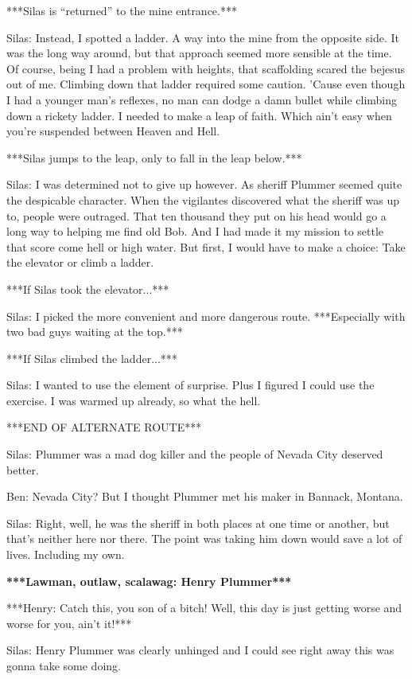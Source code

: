 \documentclass{article}
\begin{document}
***Silas is “returned” to the mine entrance.***

Silas: Instead, I spotted a ladder. A way into the mine from the opposite side. It was the long way around, but that approach seemed more sensible at the time. Of course, being I had a problem with heights, that scaffolding scared the bejesus out of me. Climbing down that ladder required some caution. 'Cause even though I had a younger man's reflexes, no man can dodge a damn bullet while climbing down a rickety ladder. I needed to make a leap of faith. Which ain't easy when you're suspended between Heaven and Hell.

***Silas jumps to the leap, only to fall in the leap below.***

Silas: I was determined not to give up however. As sheriff Plummer seemed quite the despicable character. When the vigilantes discovered what the sheriff was up to, people were outraged. That ten thousand they put on his head would go a long way to helping me find old Bob. And I had made it my mission to settle that score come hell or high water. But first, I would have to make a choice: Take the elevator or climb a ladder.

***If Silas took the elevator...***

Silas: I picked the more convenient and more dangerous route. ***Especially with two bad guys waiting at the top.***

***If Silas climbed the ladder...***

Silas: I wanted to use the element of surprise. Plus I figured I could use the exercise. I was warmed up already, so what the hell.

***END OF ALTERNATE ROUTE***

Silas: Plummer was a mad dog killer and the people of Nevada City deserved better.

Ben: Nevada City? But I thought Plummer met his maker in Bannack, Montana.

Silas: Right, well, he was the sheriff in both places at one time or another, but that's neither here nor there. The point was taking him down would save a lot of lives. Including my own.

\textbf{***Lawman, outlaw, scalawag: Henry Plummer***}

***Henry: Catch this, you son of a bitch! Well, this day is just getting worse and worse for you, ain't it!***

Silas: Henry Plummer was clearly unhinged and I could see right away this was gonna take some doing.
\end{document}
